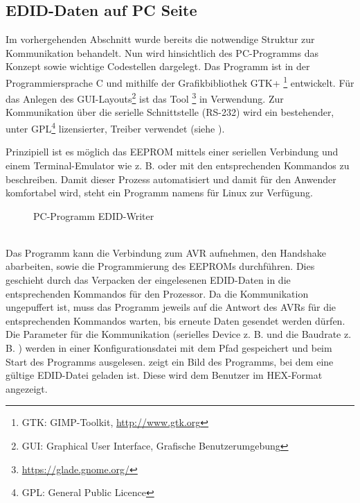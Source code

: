 \subsection{EDID-Daten auf PC Seite}
\label{edid_pc}
Im vorhergehenden Abschnitt wurde bereits die notwendige Struktur zur Kommunikation behandelt. Nun wird hinsichtlich des PC-Programms das Konzept sowie wichtige Codestellen dargelegt. Das Programm ist in der Programmiersprache C und mithilfe der Grafikbibliothek GTK+ \footnote{GTK: GIMP-Toolkit, \url{http://www.gtk.org}} entwickelt. Für das Anlegen des GUI-Layouts\footnote{GUI: Graphical User Interface, Grafische Benutzerumgebung} ist das Tool \footnote{\url{https://glade.gnome.org/}} in Verwendung. Zur Kommunikation über die serielle Schnittstelle (RS-232) wird ein bestehender, unter GPL\footnote{GPL: General Public Licence} lizensierter, Treiber verwendet (siehe \cite{rs232_lib}).

Prinzipiell ist es möglich das EEPROM mittels einer seriellen Verbindung und einem Terminal-Emulator wie z. B.  oder  mit den entsprechenden Kommandos zu beschreiben. Damit dieser Prozess automatisiert und damit für den Anwender komfortabel wird, steht ein Programm namens  für Linux zur Verfügung. 
\begin{figure}[htp]
	\center
    \caption{PC-Programm EDID-Writer}
    \label{fig:edid_writer1} 
\end{figure}\\
Das Programm kann die Verbindung zum AVR aufnehmen, den Handshake abarbeiten, sowie die Programmierung des EEPROMs durchführen. Dies geschieht durch das Verpacken der eingelesenen EDID-Daten in die entsprechenden Kommandos für den Prozessor. Da die Kommunikation ungepuffert ist, muss das Programm jeweils auf die Antwort des AVRs für die entsprechenden Kommandos warten, bis erneute Daten gesendet werden dürfen. Die Parameter für die Kommunikation (serielles Device z. B.  und die Baudrate z. B. ) werden in einer Konfigurationsdatei mit dem Pfad  gespeichert und beim Start des Programms ausgelesen.  zeigt ein Bild des Programms, bei dem eine gültige EDID-Datei geladen ist. Diese wird dem Benutzer im HEX-Format angezeigt. 

